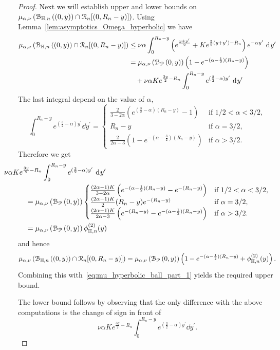 \begin{proof}
Next we will establish upper and lower bounds on $\mu_{\alpha,\nu}\left({\mathcal B}_{\mathbb{H},n}\left((0,y)\right) \cap{\mathcal R}_n[(0,R_n-y)]\right)$. Using Lemma~\ref{lem:asymptotics_Omega_hyperbolic} we have 
\begin{align*}
	\mu_{\alpha,\nu}\left({\mathcal B}_{\mathbb{H},n}\left((0,y)\right) \cap{\mathcal R}_n[(0,R_n-y)]\right) 
	&\le \nu \alpha \int_{0}^{R_n - y} \left(e^{\frac{y + y^\prime}{2}} + K e^{\frac{3}{2}(y + y^\prime) - R_n}\right)
		e^{-\alpha y^\prime} \operatorname{\, \mathrm{d}\hspace{-1pt}} y^\prime\\
	&= \mu_{\alpha,\nu}\left({\mathcal B}_{{\mathcal P}}\left(0,y\right)\right)\left(1 - e^{-(\alpha - \frac{1}{2})(R_n - y)}\right) \\
	&\hspace{10pt}+ \nu \alpha K e^{\frac{3 y}{2} - R_n}\int_0^{R_n-y} e^{(\frac{3}{2} - \alpha)y^\prime} \operatorname{\, \mathrm{d}\hspace{-1pt}} y^\prime
\end{align*}
The last integral depend on the value of $\alpha$,
\[
	\int_0^{R_n-y} e^{(\frac{3}{2} - \alpha)y^\prime} \dd y^\prime
	= \begin{cases}
		\frac{2}{3 - 2\alpha}\left(e^{(\frac{3}{2} - \alpha)(R_n - y)} - 1\right) &\mbox{if } 1/2 < \alpha < 3/2,\\
		R_n - y &\mbox{if } \alpha = 3/2,\\
		\frac{2}{2\alpha-3}\left(1 - e^{-(\alpha - \frac{3}{2})(R_n - y)}\right) &\mbox{if } \alpha > 3/2.
	\end{cases}
\]
Therefore we get
\begin{align*}
	&\hspace{-30pt}\nu \alpha K e^{\frac{3 y}{2} - R_n}\int_0^{R_n-y} e^{(\frac{3}{2} - \alpha)y^\prime} \dd y^\prime\\
	&= \Mu{\BallPo{0,y}}\begin{cases}
		\frac{(2\alpha - 1)K}{3 - 2\alpha}\left(e^{-(\alpha - \frac{1}{2})(R_n - y)} - e^{-(R_n - y)}\right)
		&\mbox{if } 1/2 < \alpha < 3/2,\\
		\frac{(2\alpha -1)K}{2} (R_n - y)e^{-(R_n - y)} &\mbox{if } \alpha = 3/2,\\
		\frac{(2\alpha - 1)K}{2\alpha - 3} \left(e^{-(R_n - y)} - e^{-(\alpha - \frac{1}{2})(R_n - y)}\right)
		&\mbox{if } \alpha > 3/2.
	\end{cases}\\
	&= \Mu{\BallPo{0,y}} \phi_{\H,n}^{(2)}(y)
\end{align*}
and hence
\[
	\mu_{\alpha,\nu}\left({\mathcal B}_{\mathbb{H},n}\left((0,y)\right) \cap{\mathcal R}_n[(0,R_n-y)]\right) = \mu_{\alpha,\nu}\left({\mathcal B}_{{\mathcal P}}\left(0,y\right)\right)\left(1 - e^{-(\alpha - \frac{1}{2})(R_n - y)} 
	+ \phi_{\mathbb{H},n}^{(2)}(y)\right).
\]
Combining this with~\eqref{eq:mu_hyperbolic_ball_part_1} yields the required upper bound.

The lower bound follows by observing that the only difference with the above computations is the change of sign in front of 
\[
	\nu \alpha K e^{\frac{3 y}{2} - R_n}\int_0^{R_n-y} e^{(\frac{3}{2} - \alpha)y^\prime} \dd y^\prime.
\]
\end{proof}

